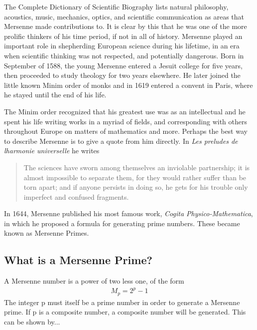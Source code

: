 
The Complete Dictionary of Scientific Biography\cite{scibio} lists natural philosophy, acoustics, music, mechanics, optics, and scientific communication as areas that Mersenne made contributions to.  It is clear by this that he was one of the more prolific thinkers of his time period, if not in all of history. Mersenne played an important role in shepherding European science during his lifetime, in an era when scientific thinking was not respected, and potentially dangerous.  Born in September of 1588, the young Mersenne entered a Jesuit college for five years, then proceeded to study theology for two years elsewhere. He later joined the little known Minim order of monks and in 1619 entered a convent in Paris, where he stayed until the end of his life.  

The Minim order recognized that his greatest use was as an intellectual and he spent his life writing works in a myriad of fields, and corresponding with others throughout Europe on matters of mathematics and more. Perhaps the best way to describe Mersenne is to give a quote from him directly. In \emph{Les preludes de lharmonie universelle} he writes \cite{lfrench}

\begin{quote}
The sciences have sworn among themselves an inviolable partnership; it is almost impossible to separate them, for they would rather suffer than be torn apart; and if anyone persists in doing so, he gets for his trouble only imperfect and confused fragments. 
\end{quote}

In 1644, Mersenne published his most famous work, \emph{Cogita Physico-Mathematica}, in which he proposed a formula for generating prime numbers. These became known as Mersenne Primes.

\subsection{What is a Mersenne Prime?}

A Mersenne number is a power of two less one, of the form
\begin{align}
M_p = 2^p - 1
\end{align}
The integer p must itself be a prime number in order to generate a Mersenne prime. If p is a
composite number, a composite number will be generated. This can be shown by...

